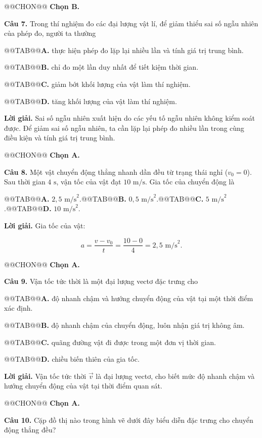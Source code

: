 \documentclass{article}
\begin{document}
@@CHON@@ \textbf{Chọn B.}

\textbf{Câu 7.} Trong thí nghiệm đo các đại lượng vật lí, để giảm thiểu sai số ngẫu nhiên của phép đo, người ta thường

@@TAB@@\textbf{A.} thực hiện phép đo lặp lại nhiều lần và tính giá trị trung bình.

@@TAB@@\textbf{B.} chỉ đo một lần duy nhất để tiết kiệm thời gian.

@@TAB@@\textbf{C.} giảm bớt khối lượng của vật làm thí nghiệm.

@@TAB@@\textbf{D.} tăng khối lượng của vật làm thí nghiệm.

\textbf{Lời giải.} Sai số ngẫu nhiên xuất hiện do các yếu tố ngẫu nhiên không kiểm soát được. Để giảm sai số ngẫu nhiên, ta cần lặp lại phép đo nhiều lần trong cùng điều kiện và tính giá trị trung bình.

@@CHON@@ \textbf{Chọn A.}

\textbf{Câu 8.} Một vật chuyển động thẳng nhanh dần đều từ trạng thái nghỉ ($v_0 = 0$). Sau thời gian $4\text{ s}$, vận tốc của vật đạt $10\text{ m/s}$. Gia tốc của chuyển động là

@@TAB@@\textbf{A.} $2{,}5\text{ m/s}^2$.@@TAB@@\textbf{B.} $0{,}5\text{ m/s}^2$.@@TAB@@\textbf{C.} $5\text{ m/s}^2$.@@TAB@@\textbf{D.} $10\text{ m/s}^2$.

\textbf{Lời giải.} Gia tốc của vật:

\[a = \frac{v - v_0}{t} = \frac{10 - 0}{4} = 2{,}5\text{ m/s}^2.\]

@@CHON@@ \textbf{Chọn A.}

\textbf{Câu 9.} Vận tốc tức thời là một đại lượng vectơ đặc trưng cho

@@TAB@@\textbf{A.} độ nhanh chậm và hướng chuyển động của vật tại một thời điểm xác định.

@@TAB@@\textbf{B.} độ nhanh chậm của chuyển động, luôn nhận giá trị không âm.

@@TAB@@\textbf{C.} quãng đường vật đi được trong một đơn vị thời gian.

@@TAB@@\textbf{D.} chiều biến thiên của gia tốc.

\textbf{Lời giải.} Vận tốc tức thời $\vec{v}$ là đại lượng vectơ, cho biết mức độ nhanh chậm và hướng chuyển động của vật tại thời điểm quan sát.

@@CHON@@ \textbf{Chọn A.}

\textbf{Câu 10.} Cặp đồ thị nào trong hình vẽ dưới đây biểu diễn đặc trưng cho chuyển động thẳng đều?
\end{document}
